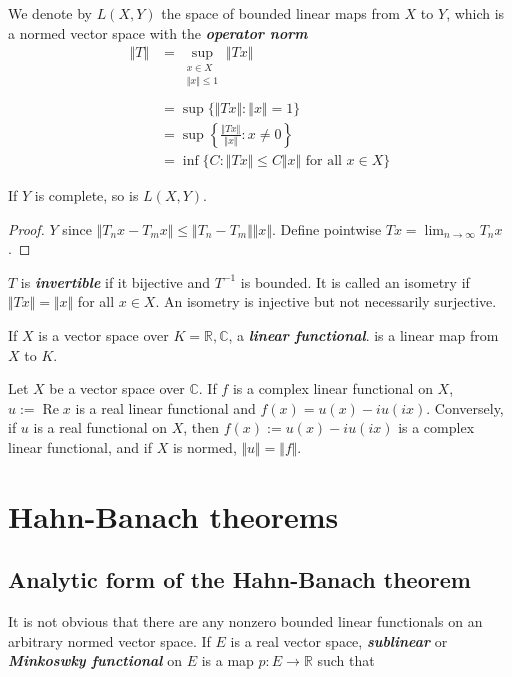 \documentclass{article}
\theoremstyle{definition}
\numberwithin{equation}{section}
\newcommand{\R}{\mathbb{R}}
\newcommand{\C}{\mathbb{C}}
\begin{document}
	We denote by $L(X,Y)$ the space of bounded linear maps from $X$ to $Y$, which is a normed vector space with the \textbf{\textit{operator norm}}
	\begin{align*}
		\Vert T\Vert&=\sup_{\substack{x\in X\\\Vert x\Vert\leq1}}\Vert Tx\Vert\\\\
		&=\sup\{\Vert Tx\Vert:\Vert x\Vert=1\}\\
		&=\sup\left\{\frac{\Vert Tx\Vert}{\Vert x\Vert}:x\neq0\right\}\\
		&=\inf\{C:\Vert Tx\Vert\leq C\Vert x\Vert \text{ for all }x\in X\}
	\end{align*}
	\begin{prop}
		If $Y$ is complete, so is $L(X,Y)$.
	\end{prop}
	\begin{proof}
		$Y$ since $\Vert T_nx-T_mx\Vert\leq\Vert T_n-T_m\Vert\Vert x\Vert$. Define pointwise $Tx=\lim_{n\to\infty}T_nx$.
	\end{proof}
	$T$ is \textbf{\textit{invertible}} if it bijective and $T^{-1}$ is bounded. It is called an isometry if $\Vert Tx\Vert=\Vert x\Vert$ for all $x\in X$. An isometry is injective but not necessarily surjective.
	
	If $X$ is a vector space over $K=\R,\C$, a \textbf{\textit{linear functional}}. is a linear map from $X$ to $K$.
	
	\begin{prop}
		Let $X$ be a vector space over $\C$. If $f$ is a complex linear functional on $X$,
		$u:=\operatorname{Re}x$ is a real linear functional and $f(x)=u(x)-iu(ix)$.
		Conversely, if $u$ is a real functional on $X$, then $f(x):=u(x)-iu(ix)$ is a complex linear functional, and if $X$ is normed, $\Vert u\Vert=\Vert f\Vert$.
	\end{prop}
	
	\section{Hahn-Banach theorems}
	\subsection{Analytic form of the Hahn-Banach theorem}
	It is not obvious that there are any nonzero bounded linear functionals on an arbitrary normed vector space. If $E$ is a real vector space, \textbf{\textit{sublinear}} or \textbf{\textit{Minkoswky functional}} on $E$ is a map $p:E\to\R$ such that
	
\end{document}
